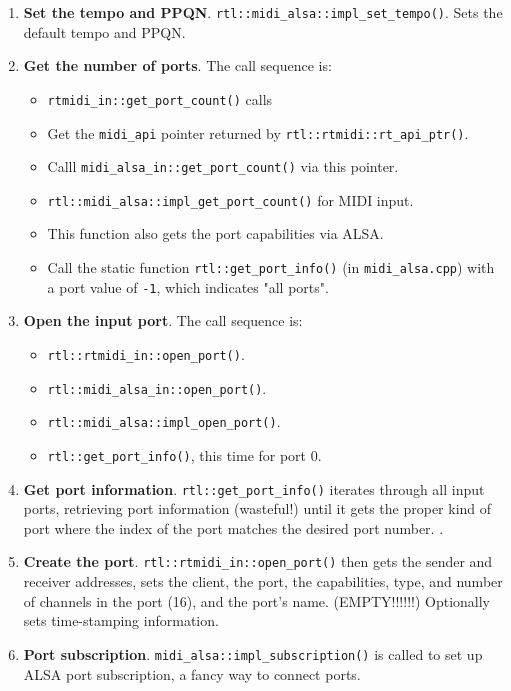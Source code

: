 \begin{enumerate}
\begin{itemize}
            \item \texttt{rtl::midi\_alsa::impl\_initialize()}
         \end{itemize}
            The ALSA sequencer handle (\texttt{snd\_seq\_t}) gets set up.
            Also called the "client" handle, not to be confused with
            "port" handles.
      \item\textbf{Set the tempo and PPQN}.
         \texttt{rtl::midi\_alsa::impl\_set\_tempo()}.
         Sets the default tempo and PPQN.
      \item \textbf{Get the number of ports}.
         The call sequence is:
         \begin{itemize}
            \item \texttt{rtmidi\_in::get\_port\_count()} calls
            \item Get the \texttt{midi\_api} pointer returned by
               \texttt{rtl::rtmidi::rt\_api\_ptr()}.
            \item Calll \texttt{midi\_alsa\_in::get\_port\_count()}
               via this pointer.
            \item \texttt{rtl::midi\_alsa::impl\_get\_port\_count()}
               for MIDI input.
            \item This function also gets the port capabilities via ALSA.
            \item Call the static function \texttt{rtl::get\_port\_info()}
               (in \texttt{midi\_alsa.cpp})
               with a port value of \texttt{-1}, which indicates "all ports".
         \end{itemize}
      \item \textbf{Open the input port}.
         The call sequence is:
         \begin{itemize}
            \item \texttt{rtl::rtmidi\_in::open\_port()}.
            \item \texttt{rtl::midi\_alsa\_in::open\_port()}.
            \item \texttt{rtl::midi\_alsa::impl\_open\_port()}.
            \item \texttt{rtl::get\_port\_info()}, this time for port 0.
         \end{itemize}
      \item \textbf{Get port information}.
         \texttt{rtl::get\_port\_info()} iterates through all input ports,
         retrieving port information (wasteful!) until it gets the 
         proper kind of port where the index of the port matches the
         desired port number.
         \texttt{}.
      \item \textbf{Create the port}.
         \texttt{rtl::rtmidi\_in::open\_port()} then gets the sender and
         receiver addresses, sets the client, the port, the capabilities, type,
         and number of channels in the port (16), and the port's name.
         (EMPTY!!!!!!)
         Optionally sets time-stamping information.
      \item \textbf{Port subscription}.
         \texttt{midi\_alsa::impl\_subscription()} is called to set up
         ALSA port subscription, a fancy way to connect ports.
   \end{enumerate}

